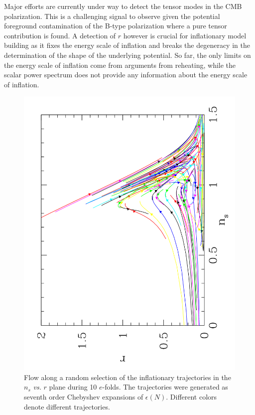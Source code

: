 \documentclass[a4paper,11pt]{article}
\begin{document}
Major efforts are currently under way to detect the tensor modes in
the CMB polarization. This is a challenging signal to observe given
the potential foreground contamination of the B-type polarization
where a pure tensor contribution is found.  A detection of $r$ however
is crucial for inflationary model building as it fixes the energy
scale of inflation and breaks the degeneracy in the determination of
the shape of the underlying potential. So far, the only limits on the
energy scale of inflation come from arguments from reheating, while
the scalar power spectrum does not provide any information about the
energy scale of inflation.


\begin{figure}
  \begin{center}
    \includegraphics[angle=270, width=0.9\linewidth]{movingpoints_sm}
  \end{center}
  \caption[Flow of observables with varying $N$]{Flow along a random
  selection of the inflationary trajectories in the $n_s$ {\it vs.}
  $r$ plane during 10 $e$-folds. The trajectories were generated as
  seventh order Chebyshev expansions of $\epsilon(N)$. Different
  colors denote different trajectories.}
  \label{fig:movingpoints}
\end{figure}
\end{document}
